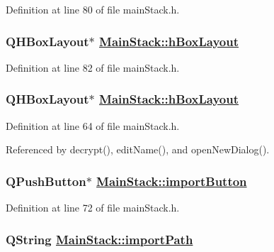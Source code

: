 Definition at line 80 of file main\-Stack.h.\hypertarget{classMainStack_r23}{
\subsubsection[hBoxLayout]{\setlength{\rightskip}{0pt plus 5cm}QHBox\-Layout$\ast$ \hyperlink{classMainStack_r7}{Main\-Stack::h\-Box\-Layout}}}
\label{classMainStack_r23}


Definition at line 82 of file main\-Stack.h.\hypertarget{classMainStack_r7}{
\subsubsection[hBoxLayout]{\setlength{\rightskip}{0pt plus 5cm}QHBox\-Layout$\ast$ \hyperlink{classMainStack_r7}{Main\-Stack::h\-Box\-Layout}}}
\label{classMainStack_r7}


Definition at line 64 of file main\-Stack.h.

Referenced by decrypt(), edit\-Name(), and open\-New\-Dialog().\hypertarget{classMainStack_r15}{
\subsubsection[importButton]{\setlength{\rightskip}{0pt plus 5cm}QPush\-Button$\ast$ \hyperlink{classMainStack_r15}{Main\-Stack::import\-Button}}}
\label{classMainStack_r15}


Definition at line 72 of file main\-Stack.h.\hypertarget{classMainStack_r4}{
\subsubsection[importPath]{\setlength{\rightskip}{0pt plus 5cm}QString \hyperlink{classMainStack_r4}{Main\-Stack::import\-Path}}}
\label{classMainStack_r4}


